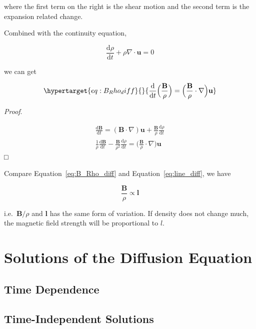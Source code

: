 \documentclass[
  notoc %
]{tufte-book}
\begin{document}
where the first term on the right is the shear motion and the second
term is the expansion related change.

Combined with the continuity equation,

\[
\frac{\mathrm{d}\rho}{\mathrm{d}t}+\rho\nabla\cdot\mathbf{u}=0
\]

we can get

\begin{equation}\protect\hypertarget{eq:B_Rho_diff}{}{
\frac{\mathrm{d}}{\mathrm{d}t}\Big( \frac{\mathbf{B}}{\rho} \Big)=\Big( \frac{\mathbf{B}}{\rho}\cdot\nabla \Big)\mathbf{u}
}\label{eq:B_Rho_diff}\end{equation}

\emph{Proof}.

\[
\begin{aligned}
\frac{\mathrm{d}\mathbf{B}}{\mathrm{d}t}=(\mathbf{B}\cdot\nabla)\mathbf{u} +\frac{\mathbf{B}}{\rho}\frac{\mathrm{d}\rho}{\mathrm{d}t} \\
\frac{1}{\rho}\frac{\mathrm{d}\mathbf{B}}{\mathrm{d}t}-\frac{\mathbf{B}}{\rho^2}\frac{\mathrm{d}\rho}{\mathrm{d}t}=\Big( \frac{\mathbf{B}}{\rho} \cdot\nabla\Big)\mathbf{u}
\end{aligned}
\] □

Compare Equation~\ref{eq:B_Rho_diff} and Equation~\ref{eq:line_diff}, we
have

\[
\frac{\mathbf{B}}{\rho}\propto \mathbf{l}
\]

i.e.~\(\mathbf{B}/\rho\) and \(\mathbf{l}\) has the same form of
variation. If density does not change much, the magnetic field strength
will be proportional to \(l\).

\hypertarget{solutions-of-the-diffusion-equation}{%
\section{Solutions of the Diffusion
Equation}\label{solutions-of-the-diffusion-equation}}

\hypertarget{time-dependence}{%
\subsection{Time Dependence}\label{time-dependence}}

\hypertarget{time-independent-solutions}{%
\subsection{Time-Independent
Solutions}\label{time-independent-solutions}}
\end{document}
